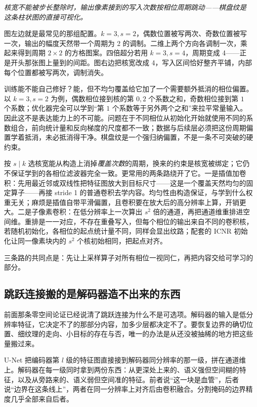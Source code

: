 \emph{核宽不能被步长整除时，输出像素接到的写入次数按相位周期跳动——棋盘纹是这条柱状图的直接可视化。}

图左边就是最常见的那组配置。\(k=3,s=2\)，偶数位置被写两次、奇数位置被写一次，输出的幅度天然带一个周期为 2 的调制。二维上两个方向各调制一次，乘起来得到周期 \(2\times2\) 的方格图案。四倍超分若用 \(k=3,s=4\)，周期变成 4——正是开头那张图上量到的间距。图右边把核宽改成 4，写入区间恰好整齐平铺，内部每个位置都被写两次，调制消失。

训练能不能自己修好？能，但不均匀覆盖给它加了一个需要额外抵消的相位偏置。以 \(k=3,s=2\) 为例，偶数相位接到核的第 \(0,2\) 个系数之和，奇数相位接到第 \(1\) 个系数；优化器完全可以学到``第 \(1\) 个系数等于另外两个之和''来拉平常量输入。因此这不是表达能力上的不可能。问题在于不同相位从初始化开始就使用不同的系数组合，前向统计量和反向梯度的尺度都不一致；数据与后续层必须把这份周期偏置学着抵消，未必抵消得干净。棋盘纹是一个强归纳偏置，不是一条不可突破的硬约束。

按 \(s \mid k\) 选核宽能从构造上消掉\emph{覆盖次数}的周期，换来的约束是核宽被绑定；它仍不保证学到的各相位滤波器完全一致。更常用的两条路绕开了它。一是插值加卷积：先用最近邻或双线性把特征图放大到目标尺寸——这是一个覆盖天然均匀的固定算子——再接 stride 1 的普通卷积去学内容。均匀性由构造保证，与学到什么权重无关；麻烦是插值自带平滑偏置，且卷积要在放大后的高分辨率上算，开销更大。二是子像素卷积：在低分辨率上一次算出 \(s^2\) 倍的通道，再把通道维重排进空间维。重排是一一对应，不存在重叠写入，但每个相位的输出来自不同的卷积核，若随机初始化，各相位的起点统计量不同，同样会显出纹路；配套的 ICNR 初始化让同一像素块内的 \(s^2\) 个核初始相同，把起点对齐。

三条路的共同点是：先让上采样算子对所有相位一视同仁，再把内容交给可学习的部分。

\subsection{跳跃连接搬的是解码器造不出来的东西}

前面那条零空间论证已经说清了跳跃连接为什么不是可选项。解码器的输入是低分辨率特征，它决定不了的那部分内容，加多少层都决定不了。要恢复边界的确切位置、细纹理的走向、小目标的存在与否，唯一的办法是从还没被抽稀的地方把这些量搬过来。

U-Net 把编码器第 \(l\) 级的特征图直接接到解码器同分辨率的那一级，拼在通道维上。解码器在每一级同时拿到两份东西：从更深处上来的、语义强但空间糊的特征，以及从旁路来的、语义弱但空间准的特征。前者说``这一块是血管''，后者说``边界在这条线上''，两者在同一分辨率上对齐后由卷积融合。分割掩码的边界精度几乎全部来自后者。

